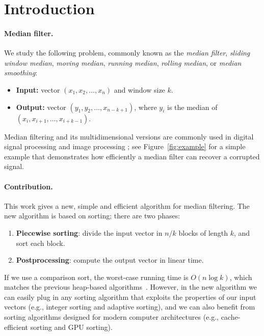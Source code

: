 \documentclass[a4paper,11pt]{article}
\begin{document}
\thispagestyle{empty}
\clearpage
\setcounter{page}{1}

\section{Introduction}\label{sec:intro}

\paragraph{Median filter.}

We study the following problem, commonly known as the \emph{median filter}, \emph{sliding window median}, \emph{moving median}, \emph{running median}, \emph{rolling median}, or \emph{median smoothing}:
\begin{itemize}[noitemsep]
    \item \textbf{Input:} vector $(x_1,x_2,\dotsc,x_n)$ and window size $k$.
    \item \textbf{Output:} vector $(y_1,y_2,\dotsc,x_{n-k+1})$, where $y_i$ is the median of $(x_i,x_{i+1},\dotsc,x_{i+k-1})$.
\end{itemize}
Median filtering and its multidimensional versions are commonly used in digital signal processing  and image processing ; see Figure~\ref{fig:example} for a simple example that demonstrates how efficiently a median filter can recover a corrupted signal.

\paragraph{Contribution.}

This work gives a new, simple and efficient algorithm for median filtering. The new algorithm is based on sorting; there are two phases:
\begin{enumerate}[noitemsep]
    \item \textbf{Piecewise sorting}: divide the input vector in $n/k$ blocks of length $k$, and sort each block.
    \item \textbf{Postprocessing}: compute the output vector in linear time.
\end{enumerate}
If we use a comparison sort, the worst-case running time is $O(n \log k)$, which matches the previous heap-based algorithms~\cite{astola89median,juhola91comparison,hardle95median-smooth}. However, in the new algorithm we can easily plug in any sorting algorithm that exploits the properties of our input vectors (e.g., integer sorting and adaptive sorting), and we can also benefit from sorting algorithms designed for modern computer architectures (e.g., cache-efficient sorting and GPU sorting).
\end{document}
